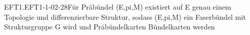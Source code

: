 \begin{PROP}{EFT1.EFT1-1-02-28}{Für Präbündel (E,pi,M) existiert auf E genau einem Topologie und differenzierbare Struktur, sodass (E,pi,M) ein Faserbündel mit Strukturgruppe G wird und Präbündelkarten Bündelkarten werden}

\end{PROP}
